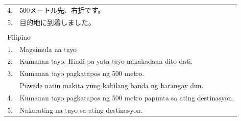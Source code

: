\begin{table}[h]
\begin{tabular}{ll}
4. & 500メートル先、右折です。                                                          \\
5. & 目的地に到着しました。                                                             \\ \hline
   &                                                                         \\ \hline
\multicolumn{2}{l}{Filipino}                                                 \\ \hline
1. & Magsimula na tayo                                                       \\
2. & Kumanan tayo. Hindi pa yata tayo nakakadaan dito dati.                  \\
3. & Kumanan tayo pagkatapos ng 500 metro.                                   \\
   & Puwede natin makita yung kabilang banda ng barangay dun.                \\
4. & Kumanan tayo pagkatapos ng 500 metro papunta sa ating destinasyon.      \\
5. & Nakarating na tayo sa ating destinasyon.                                \\ \hline
\end{tabular}
\end{table}

